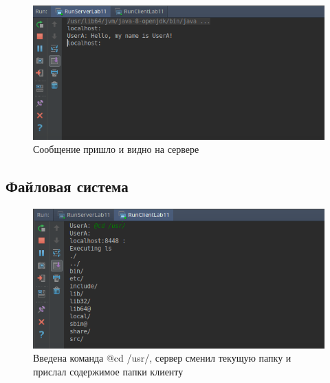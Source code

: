 \documentclass{article}
\begin{document}
\begin{figure}[H]
	\begin{flushleft}
		\centerline{\includegraphics[scale=0.7]{servermessage.png}}
		\caption{Сообщение пришло и видно на сервере}
	\end{flushleft}
\end{figure}

\subsection{Файловая система}
\begin{figure}[H]
	\begin{flushleft}
		\centerline{\includegraphics[scale=0.7]{cdrespond.png}}
		\caption{Введена команда @cd /usr/, сервер сменил текущую папку и прислал содержимое папки клиенту}
	\end{flushleft}
\end{figure}
\end{document}
